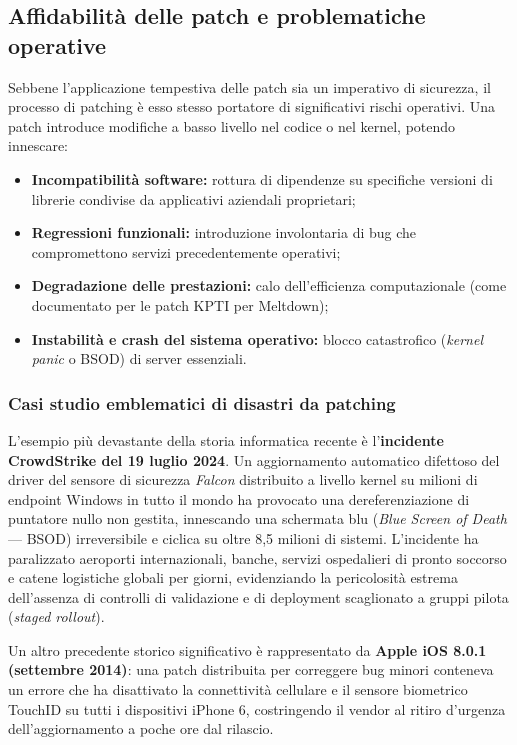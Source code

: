 \documentclass[../../main.tex]{subfiles}
\begin{document}
\subsection{Affidabilità delle patch e problematiche operative}
\label{subsec:affidabilita_patch}

Sebbene l'applicazione tempestiva delle patch sia un imperativo di sicurezza, il processo di patching è esso stesso portatore di significativi rischi operativi. Una patch introduce modifiche a basso livello nel codice o nel kernel, potendo innescare:
\begin{itemize}
    \item \textbf{Incompatibilità software:} rottura di dipendenze su specifiche versioni di librerie condivise da applicativi aziendali proprietari;
    \item \textbf{Regressioni funzionali:} introduzione involontaria di bug che compromettono servizi precedentemente operativi;
    \item \textbf{Degradazione delle prestazioni:} calo dell'efficienza computazionale (come documentato per le patch KPTI per Meltdown);
    \item \textbf{Instabilità e crash del sistema operativo:} blocco catastrofico (\textit{kernel panic} o BSOD) di server essenziali.
\end{itemize}

\subsubsection{Casi studio emblematici di disastri da patching}
L'esempio più devastante della storia informatica recente è l'\textbf{incidente CrowdStrike del 19 luglio 2024}. Un aggiornamento automatico difettoso del driver del sensore di sicurezza \textit{Falcon} distribuito a livello kernel su milioni di endpoint Windows in tutto il mondo ha provocato una dereferenziazione di puntatore nullo non gestita, innescando una schermata blu (\textit{Blue Screen of Death} --- BSOD) irreversibile e ciclica su oltre 8,5 milioni di sistemi. L'incidente ha paralizzato aeroporti internazionali, banche, servizi ospedalieri di pronto soccorso e catene logistiche globali per giorni, evidenziando la pericolosità estrema dell'assenza di controlli di validazione e di deployment scaglionato a gruppi pilota (\textit{staged rollout}).

Un altro precedente storico significativo è rappresentato da \textbf{Apple iOS 8.0.1 (settembre 2014)}: una patch distribuita per correggere bug minori conteneva un errore che ha disattivato la connettività cellulare e il sensore biometrico TouchID su tutti i dispositivi iPhone 6, costringendo il vendor al ritiro d'urgenza dell'aggiornamento a poche ore dal rilascio.
\end{document}
